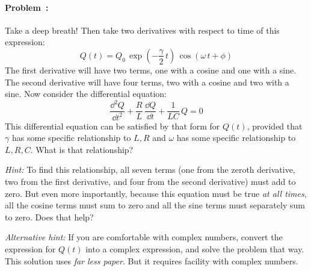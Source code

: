 \documentclass[12pt]{article}
\begin{document}
\paragraph{Problem~\theproblem:}%
Take a deep breath!
Then take two derivatives with respect to time of this expression:
\begin{equation}
  Q(t) = Q_0\,\exp(-\frac{\gamma}{2}\,t)\,\cos(\omega\,t+\phi)
\end{equation}
The first derivative will have two terms, one with a cosine and one
with a sine. The second derivative will have four terms, two with a
cosine and two with a sine. Now consider the differential equation:
\begin{equation}
  \frac{\dd^2 Q}{\dd t^2} + \frac{R}{L}\,\frac{\dd Q}{\dd t} + \frac{1}{LC}\,Q = 0
\end{equation}
This differential equation can be satisfied by that form for $Q(t)$,
provided that $\gamma$ has some specific relationship to $L, R$ and
$\omega$ has some specific relationship to $L, R, C$. What is that
relationship?

\textsl{Hint:} To find this relationship, all seven terms (one from
the zeroth derivative, two from the first derivative, and four from
the second derivative) must add to zero. But even more importantly,
because this equation must be true \emph{at all times}, all the cosine
terms must sum to zero and all the sine terms must separately sum to
zero. Does that help?

\textsl{Alternative hint:} If you are comfortable with complex
numbers, convert the expression for $Q(t)$ into a complex expression,
and solve the problem that way. This solution uses \emph{far less
  paper}. But it requires facility with complex numbers.
\end{document}

